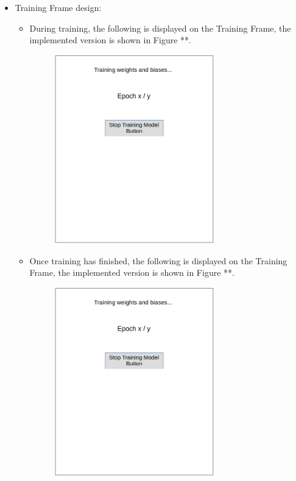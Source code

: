 \documentclass[./project-report/src/latex/project-report.tex]{subfiles}
\begin{document}
\begin{itemize}
    \pagebreak

    \item Training Frame design: 
        \begin{itemize}
            \item During training, the following is displayed on the Training Frame, the implemented version is shown in Figure **.
                \begin{figure}[h!]
                \centering
                \includegraphics[width=0.7\textwidth]{./project-report/src/images/training-frame-1-design.png}
                \end{figure}

            \pagebreak

            \item Once training has finished, the following is displayed on the Training Frame, the implemented version is shown in Figure **.
                \begin{figure}[h!]
                \centering
                \includegraphics[width=0.7\textwidth]{./project-report/src/images/training-frame-1-design.png}
                \end{figure}
            \end{itemize}


\end{itemize}
\end{document}
